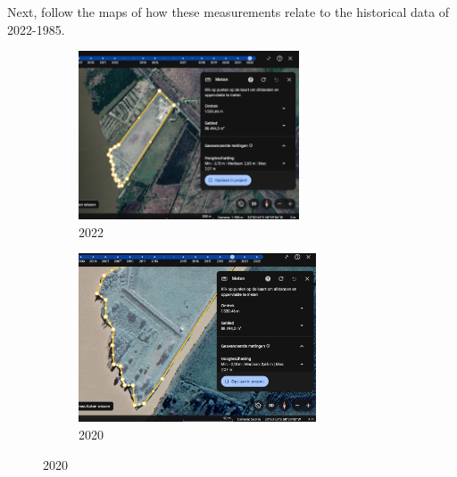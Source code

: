 Next, follow the maps of how these measurements relate to the historical data of 2022-1985.
\begin{figure}[H]
    \centering
    \begin{subfigure}[b]{0.48\textwidth}
        \includegraphics[width=\linewidth, height =5cm]{figures/appendix-g/opp2022.png}
        \caption{2022}
        \label{fig:second}
    \end{subfigure}
    \hfill
    \begin{subfigure}[b]{0.48\textwidth}
        \includegraphics[width=\linewidth, height =5cm]{figures/appendix-g/opp2020.png}
        \caption{2020}
        \label{fig:second}
    \end{subfigure}
    

    \vspace{0.5cm}


\end{figure}
